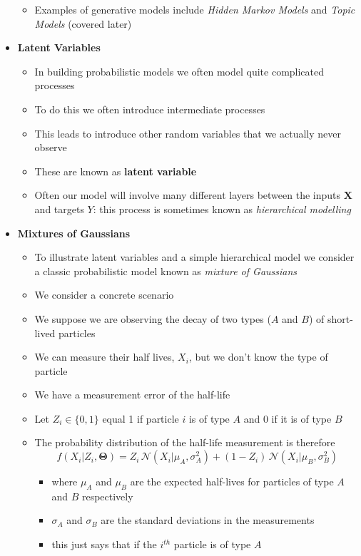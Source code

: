 \documentclass[11pt]{article}
\newcommand{\normal}[2]{\mathcal{N}\!\left(#1 \big| #2 \right)}
\begin{document}
\begin{itemize}
\begin{itemize}
\item Examples of generative models include \emph{Hidden Markov Models}
and \emph{Topic Models} (covered later)
\end{itemize}
\item \textbf{Latent Variables}
\begin{itemize}
\item In building probabilistic models we often model quite
complicated processes
\item To do this we often introduce intermediate processes
\item This leads to introduce other random variables that we actually
never observe
\item These are known as \textbf{latent variable}
\item Often our model will involve many different layers between the
inputs \(\bm{X}\) and targets \(Y\): this process is sometimes
known as \emph{hierarchical  modelling}
\end{itemize}
\item \textbf{Mixtures of Gaussians}
\begin{itemize}
\item To illustrate latent variables and a simple hierarchical model
we consider a classic probabilistic model known as \emph{mixture of Gaussians}
\item We consider a concrete scenario
\item We suppose we are observing the decay of two types (\(A\) and
\(B\)) of short-lived particles
\item We can measure their half lives, \(X_i\), but we don't know the type
of particle
\item We have a measurement error of the half-life
\item Let \(Z_i \in \{0,1\}\) equal 1 if  particle \(i\) is of type \(A\)
and 0 if it is of type \(B\)
\item The probability distribution of the half-life measurement is
therefore
$$ f(X_i|Z_i,\bm{\Theta}) = Z_i\,\normal{X_i}{\mu_A,\sigma_A^2} +
         (1-Z_i)\,\normal{X_i}{\mu_B,\sigma_B^2} $$
\begin{itemize}
\item where \(\mu_A\) and \(\mu_B\) are the expected half-lives for
particles of type \(A\) and \(B\) respectively
\item \(\sigma_A\) and \(\sigma_B\) are the standard deviations in the measurements
\item this just says that if the \(i^{th}\) particle is of type \(A\)

\end{itemize}
\end{itemize}
\end{itemize}
\end{document}
